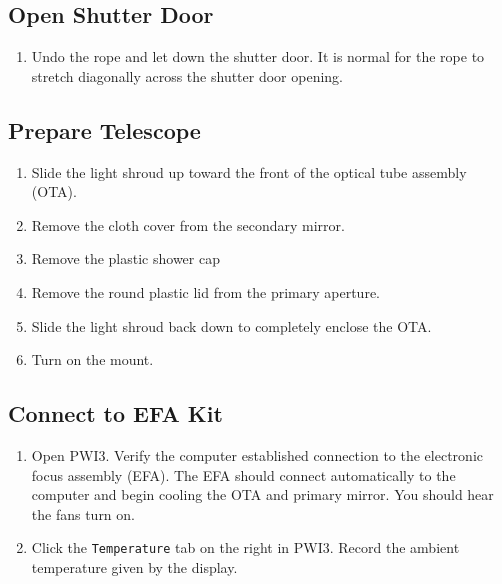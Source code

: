 \documentclass{article}
\begin{document}
		\subsection{Open Shutter Door}

			\begin{enumerate}

				\item Undo the rope and let down the shutter door. It is normal for the rope to stretch diagonally across the shutter door opening.

			\end{enumerate}

		\subsection{Prepare Telescope}

			\begin{enumerate}

				\item Slide the light shroud up toward the front of the optical tube assembly (OTA).

				\item Remove the cloth cover from the secondary mirror.

				\item Remove the plastic shower cap

				\item Remove the round plastic lid from the primary aperture.

				\item Slide the light shroud back down to completely enclose the OTA.

				\item Turn on the mount.

			\end{enumerate}

		\subsection{Connect to EFA Kit}

			\begin{enumerate}

				\item Open PWI3. Verify the computer established connection to the electronic focus assembly (EFA). The EFA should connect automatically to the computer and begin cooling the OTA and primary mirror. You should hear the fans turn on.

				\item Click the \texttt{Temperature} tab on the right in PWI3. Record the ambient temperature given by the display.

			\end{enumerate}
\end{document}
